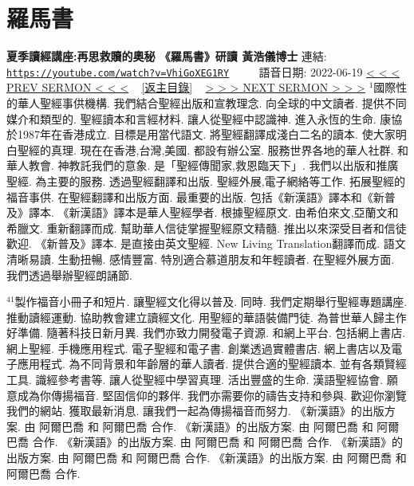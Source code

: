 \documentclass{book}
\begin{document}
\section{羅馬書}
\label{sec:VhiGoXEG1RY}
\textbf{夏季讀經講座:再思救贖的奧秘 《羅馬書》研讀 黃浩儀博士}
\newline
\newline
連結: \href{https://youtube.com/watch?v=VhiGoXEG1RY}{\texttt{https://youtube.com/watch?v=VhiGoXEG1RY}} ~~~~ 語音日期: 2022-06-19
\newline
\newline
\hyperref[sec:0UjUn93f77k]{\small{< < < PREV SERMON < < <}}
~
\hyperref[sec:index]{\small{[返主目錄]}}
~
\hyperref[sec:A_3yEYQkm9Y]{\small{> > > NEXT SERMON > > >}}
\newline
\newline
$^{1}$國際性的華人聖經事供機構.
我們結合聖經出版和宣教理念.
向全球的中文讀者.
提供不同媒介和類型的.
聖經讀本和言經材料.
讓人從聖經中認識神.
進入永恆的生命.
康協於1987年在香港成立.
目標是用當代語文.
將聖經翻譯成淺白二名的讀本.
使大家明白聖經的真理.
現在在香港,台灣,美國.
都設有辦公室.
服務世界各地的華人社群.
和華人教會.
神教託我們的意象.
是「聖經傳聞家,救恩臨天下」.
我們以出版和推廣聖經.
為主要的服務.
透過聖經翻譯和出版.
聖經外展,電子網絡等工作.
拓展聖經的福音事供.
在聖經翻譯和出版方面.
最重要的出版.
包括《新漢語》譯本和《新普及》譯本.
《新漢語》譯本是華人聖經學者.
根據聖經原文.
由希伯來文,亞蘭文和希臘文.
重新翻譯而成.
幫助華人信徒掌握聖經原文精髓.
推出以來深受目者和信徒歡迎.
《新普及》譯本.
是直接由英文聖經.
New Living Translation翻譯而成.
語文清晰易讀.
生動扭暢.
感情豐富.
特別適合慕道朋友和年輕讀者.
在聖經外展方面.
我們透過舉辦聖經朗誦節.

$^{41}$製作福音小冊子和短片.
讓聖經文化得以普及.
同時.
我們定期舉行聖經專題講座.
推動讀經運動.
協助教會建立讀經文化.
用聖經的華語裝備門徒.
為普世華人歸主作好準備.
隨著科技日新月異.
我們亦致力開發電子資源.
和網上平台.
包括網上書店.
網上聖經.
手機應用程式.
電子聖經和電子書.
創業透過實體書店.
網上書店以及電子應用程式.
為不同背景和年齡層的華人讀者.
提供合適的聖經讀本.
並有各類賢經工具.
識經參考書等.
讓人從聖經中學習真理.
活出豐盛的生命.
漢語聖經協會.
願意成為你傳揚福音.
堅固信仰的夥伴.
我們亦需要你的禱告支持和參與.
歡迎你瀏覽我們的網站.
獲取最新消息.
讓我們一起為傳揚福音而努力.
《新漢語》的出版方案.
由 阿爾巴喬 和 阿爾巴喬 合作.
《新漢語》的出版方案.
由 阿爾巴喬 和 阿爾巴喬 合作.
《新漢語》的出版方案.
由 阿爾巴喬 和 阿爾巴喬 合作.
《新漢語》的出版方案.
由 阿爾巴喬 和 阿爾巴喬 合作.
《新漢語》的出版方案.
由 阿爾巴喬 和 阿爾巴喬 合作.
\end{document}
